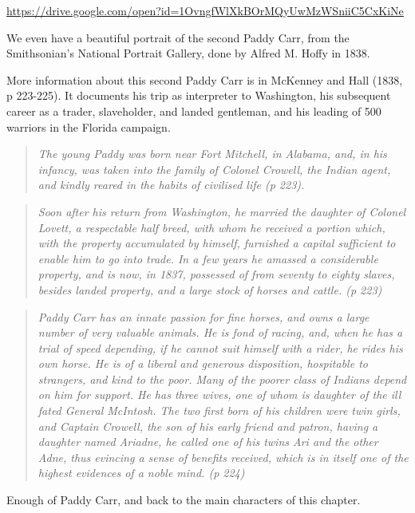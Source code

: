 \documentclass[
  12pt,
]{book}
\begin{document}
\url{https://drive.google.com/open?id=1OvngfWlXkBOrMQyUwMzWSniiC5CxKiNe}

We even have a beautiful portrait of the second Paddy Carr, from the Smithsonian's National Portrait Gallery, done by Alfred M. Hoffy in 1838.

More information about this second Paddy Carr is in McKenney and Hall (1838, p 223-225). It documents his trip as interpreter to Washington, his subsequent career as a trader, slaveholder, and landed gentleman, and his leading of 500 warriors in the Florida campaign.

\begin{quote}
\emph{The young Paddy was born near Fort Mitchell, in Alabama, and, in his infancy, was taken into the family of Colonel Crowell, the Indian agent, and kindly reared in the habits of civilised life (p 223).}
\end{quote}

\begin{quote}
\emph{Soon after his return from Washington, he married the daughter of Colonel Lovett, a respectable half breed, with whom he received a portion which, with the property accumulated by himself, furnished a capital sufficient to enable him to go into trade. In a few years he amassed a considerable property, and is now, in 1837, possessed of from seventy to eighty slaves, besides landed property, and a large stock of horses and cattle. (p 223)}
\end{quote}

\begin{quote}
\emph{Paddy Carr has an innate passion for fine horses, and owns a large number of very valuable animals. He is fond of racing, and, when he has a trial of speed depending, if he cannot suit himself with a rider, he rides his own horse. He is of a liberal and generous disposition, hospitable to strangers, and kind to the poor. Many of the poorer class of Indians depend on him for support. He has three wives, one of whom is daughter of the ill fated General McIntosh. The two first born of his children were twin girls, and Captain Crowell, the son of his early friend and patron, having a daughter named Ariadne, he called one of his twins Ari and the other Adne, thus evincing a sense of benefits received, which is in itself one of the highest evidences of a noble mind. (p 224)}
\end{quote}

Enough of Paddy Carr, and back to the main characters of this chapter.
\end{document}
